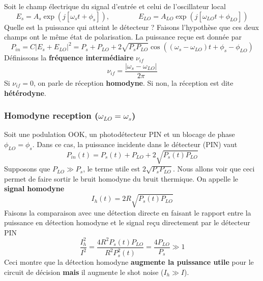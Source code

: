 Soit le champ électrique du signal d'entrée et celui de l'oscillateur local
\begin{equation}
{E_s} = {A_s}\exp \left( {j[{\omega _s}t + {\phi _s}]} \right),\qquad\qquad
{E_{LO}} = {A_{LO}}\exp \left( {j[{\omega _{LO}}t + {\phi _{LO}}]} \right)
\end{equation}
Quelle est la puissance qui atteint le détecteur ? Faisons l'hypothèse que ces deux champs
ont le même état de polarisation. La puissance reçue est donnée par
\begin{equation}
{P_{in}} = C{\left| {{E_s} + {E_{LO}}} \right|^2} = {P_s} + {P_{LO}} + 2\sqrt {{P_s}{P_{LO}}} \cos \left( {({\omega _s} - {\omega _{LO}})t + {\phi _s} - {\phi _{LO}}} \right)
\end{equation}
Définissons la \textbf{fréquence intermédiaire} $\nu_{if}$
\begin{equation}
{\nu _{if}} = \frac{{|{\omega _s} - {\omega _{LO}}|}}{{2\pi }}
\end{equation}
Si $\nu_{if}=0$, on parle de réception \textbf{homodyne}. Si non, la réception est dite
\textbf{hétérodyne}.

\subsubsection{Homodyne reception ($\omega_{LO}=\omega_s$)}
Soit une podulation OOK, un photodétecteur PIN et un blocage de phase $\phi_{LO}=\phi_s$. Dans ce
cas, la puissance incidente dans le détecteur (PIN) vaut
\begin{equation}
{P_{in}}(t) = {P_s}(t) + {P_{LO}} + 2\sqrt {{P_s}(t){P_{LO}}} 
\end{equation}
Supposons que $P_{LO}\gg P_s$, le terme utile est $2\sqrt {{P_s}{P_{LO}}}$. Nous allons voir que
ceci permet de faire sortir le bruit homodyne du bruit thermique. On appelle le
\textbf{signal homodyne}
\begin{equation}
{I_h}(t) = 2R\sqrt {{P_s}(t){P_{LO}}} 
\end{equation}
Faisons la comparaison avec une détection directe en faisant le rapport entre la puissance en
détection homodyne et le signal reçu directement par le détecteur PIN
\begin{equation}
\frac{{I_h^2}}{{{I^2}}} = \frac{{4{R^2}{P_s}(t){P_{LO}}}}{{{R^2}P_s^2(t)}} = \frac{{4{P_{LO}}}}{{{P_s}}} \gg 1
\end{equation}
Ceci montre que la détection homodyne \textbf{augmente la puissance utile} pour le circuit de
décision \textbf{mais} il augmente le shot noise ($I_h\gg I$).\\


